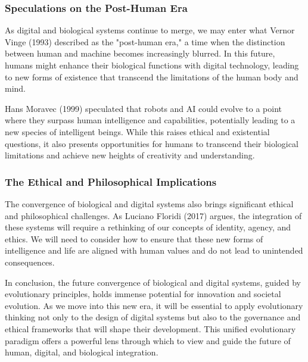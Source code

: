 \documentclass[12pt,twoside]{article}
\begin{document}
\subsubsection{Speculations on the Post-Human Era}

As digital and biological systems continue to merge, we may enter what Vernor Vinge (1993) described as the "post-human era," a time when the distinction between human and machine becomes increasingly blurred. In this future, humans might enhance their biological functions with digital technology, leading to new forms of existence that transcend the limitations of the human body and mind.

Hans Moravec (1999) speculated that robots and AI could evolve to a point where they surpass human intelligence and capabilities, potentially leading to a new species of intelligent beings. While this raises ethical and existential questions, it also presents opportunities for humans to transcend their biological limitations and achieve new heights of creativity and understanding.


\subsubsection{The Ethical and Philosophical Implications}

The convergence of biological and digital systems also brings significant ethical and philosophical challenges. As Luciano Floridi (2017) argues, the integration of these systems will require a rethinking of our concepts of identity, agency, and ethics. We will need to consider how to ensure that these new forms of intelligence and life are aligned with human values and do not lead to unintended consequences.

In conclusion, the future convergence of biological and digital systems, guided by evolutionary principles, holds immense potential for innovation and societal evolution. As we move into this new era, it will be essential to apply evolutionary thinking not only to the design of digital systems but also to the governance and ethical frameworks that will shape their development. This unified evolutionary paradigm offers a powerful lens through which to view and guide the future of human, digital, and biological integration.
\end{document}
